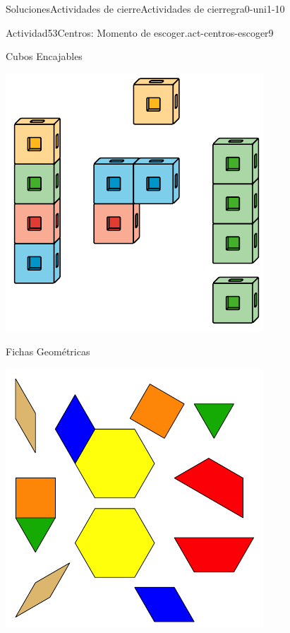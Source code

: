 \documentclass[twoside,10pt,]{article}
\begin{document}
\begin{solutions-section}{Soluciones}{Actividades de cierre}{}{Actividades de cierre}{}{}{gra0-uni1-10}
\begin{activitysolution}{Actividad}{53}{Centros: Momento de escoger.}{act-centros-escoger9}
\begin{sidebyside}{2}{0.025}{0.025}{0.05}
\begin{sbspanel}{0.45}
Cubos Encajables%
\par
\includegraphics[width=\linewidth]{external/svg-source/tikz-file-128850.pdf}
\end{sbspanel}%
\begin{sbspanel}{0.45}%
Fichas Geométricas%
\par
\includegraphics[width=\linewidth]{external/svg-source/tikz-file-147344.pdf}

\end{sbspanel}
\end{sidebyside}
\end{activitysolution}
\end{solutions-section}
\end{document}
